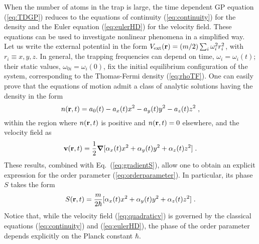 When the number of atoms in the trap is large, the time dependent GP 
equation (\ref{eq:TDGP}) reduces to the equations of continuity 
(\ref{eq:continuity}) for the density  and the  Euler equation 
(\ref{eq:eulerHD}) for the velocity field. These equations can be used 
to investigate nonlinear phenomena in a simplified way. Let us write 
the external potential in the form $V_{\rm ext}({\bf r}) = 
(m/2)\sum_i \omega_i^2 r_i^2$, with $r_i\equiv x,y,z$. In general, 
the trapping frequencies can depend on time, $\omega_i=\omega_i(t)$; 
their static values, $\omega_{0i}=\omega_i(0)$, fix the
initial equilibrium configuration of the system, corresponding to the
Thomas-Fermi density (\ref{eq:rhoTF}). One can easily prove that the 
equations of motion admit a class of analytic solutions having the
density in the form
\begin{equation}
n({\bf r},t) = a_0(t) - a_x(t) x^2 - a_y(t) y^2 - a_z(t) z^2   \; ,
\label{eq:quadraticn}
\end{equation}
within the region where $n({\bf r},t)$ is positive and $n({\bf r},t)=0$
elsewhere, and the velocity field as
\begin{equation}
{\bf v} ({\bf r},t)  =  {1\over2} \mbox{\boldmath$\nabla$} [
\alpha_x(t) x^2 + \alpha_y(t) y^2 + \alpha_z(t) z^2] \; .
\label{eq:quadraticv}
\end{equation}
These results, combined with Eq.~(\ref{eq:gradientS}), allow one to obtain 
an explicit expression for the order parameter (\ref{eq:orderparameter}).
In particular, its phase $S$ takes the form 
\begin{equation}
S ({\bf r},t) = { m \over 2 \hbar } [\alpha_x(t) x^2 + 
\alpha_y(t) y^2 + \alpha_z(t) z^2] \; . 
\label{eq:S}
\end{equation}
Notice that, while the velocity field (\ref{eq:quadraticv}) is governed 
by the classical equations (\ref{eq:continuity}) and (\ref{eq:eulerHD}),
the phase of the order parameter depends explicitly on the Planck
constant $\hbar$.  

